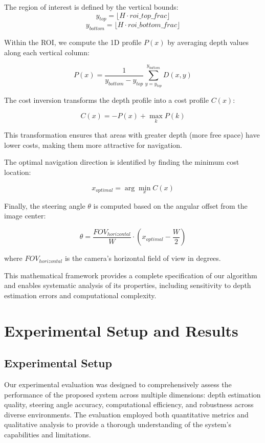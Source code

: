\documentclass[conference]{IEEEtran}
\begin{document}
The region of interest is defined by the vertical bounds:
\begin{equation}
y_{top} = \lfloor H \cdot roi\_top\_frac \rfloor
\end{equation}
\begin{equation}
y_{bottom} = \lfloor H \cdot roi\_bottom\_frac \rfloor
\end{equation}

Within the ROI, we compute the 1D profile $P(x)$ by averaging depth values along each vertical column:

\begin{equation}
P(x) = \frac{1}{y_{bottom} - y_{top}} \sum_{y=y_{top}}^{y_{bottom}} D(x,y)
\end{equation}

The cost inversion transforms the depth profile into a cost profile $C(x)$:

\begin{equation}
C(x) = -P(x) + \max_{k} P(k)
\end{equation}

This transformation ensures that areas with greater depth (more free space) have lower costs, making them more attractive for navigation.

The optimal navigation direction is identified by finding the minimum cost location:

\begin{equation}
x_{optimal} = \arg\min_{x} C(x)
\end{equation}

Finally, the steering angle $\theta$ is computed based on the angular offset from the image center:

\begin{equation}
\theta = \frac{FOV_{horizontal}}{W} \cdot (x_{optimal} - \frac{W}{2})
\end{equation}

where $FOV_{horizontal}$ is the camera's horizontal field of view in degrees.

This mathematical framework provides a complete specification of our algorithm and enables systematic analysis of its properties, including sensitivity to depth estimation errors and computational complexity.

\section{Experimental Setup and Results}

\subsection{Experimental Setup}
Our experimental evaluation was designed to comprehensively assess the performance of the proposed system across multiple dimensions: depth estimation quality, steering angle accuracy, computational efficiency, and robustness across diverse environments. The evaluation employed both quantitative metrics and qualitative analysis to provide a thorough understanding of the system's capabilities and limitations.
\end{document}
